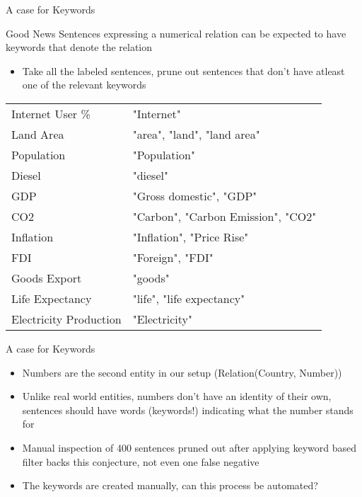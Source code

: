 \documentclass{beamer}
\begin{document}
\begin{frame}{A case for Keywords}
 \begin{exampleblock}{Good News}
  Sentences expressing a numerical relation can be expected to have keywords that denote the relation
 \end{exampleblock}

 \begin{itemize}
  \item Take all the labeled sentences, prune out sentences that don't have atleast one of the relevant keywords
 \end{itemize}
 
 \begin{tabular}{|l|l|}
  \hline
  Internet User \% & "Internet" \\
Land Area & "area", "land", "land area" \\
Population &"Population" \\
Diesel & "diesel" \\
GDP &"Gross domestic", "GDP" \\
CO2 &"Carbon", "Carbon Emission", "CO2" \\
Inflation & "Inflation", "Price Rise" \\
FDI & "Foreign", "FDI" \\
Goods Export & "goods" \\
Life Expectancy & "life", "life expectancy" \\
Electricity Production & "Electricity" \\
 \hline
 \end{tabular}
\end{frame}

\begin{frame}{A case for Keywords}
\begin{itemize}
  \item Numbers are the second entity in our setup (Relation(Country, Number))
  \item Unlike real world entities, numbers don't have an identity of their own, sentences should have words (keywords!) indicating what the number stands for
  \item Manual inspection of 400 sentences pruned out after applying keyword based filter backs this conjecture, not even one false negative
  \item The keywords are created manually, can this process be automated?
\end{itemize}
\end{frame}
\end{document}

